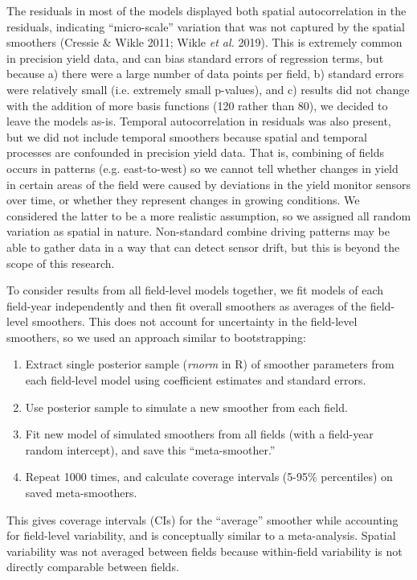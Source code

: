 \documentclass[]{elsarticle} %
\providecommand{\tightlist}{%
  \setlength{\itemsep}{0pt}\setlength{\parskip}{0pt}}
\begin{document}
The residuals in most of the models displayed both spatial autocorrelation in the residuals, indicating ``micro-scale'' variation that was not captured by the spatial smoothers (Cressie \& Wikle 2011; Wikle \emph{et al.} 2019).
This is extremely common in precision yield data, and can bias standard errors of regression terms, but because a) there were a large number of data points per field, b) standard errors were relatively small (i.e. extremely small p-values), and c) results did not change with the addition of more basis functions (120 rather than 80), we decided to leave the models as-is.
Temporal autocorrelation in residuals was also present, but we did not include temporal smoothers because spatial and temporal processes are confounded in precision yield data.
That is, combining of fields occurs in patterns (e.g. east-to-west) so we cannot tell whether changes in yield in certain areas of the field were caused by deviations in the yield monitor sensors over time, or whether they represent changes in growing conditions.
We considered the latter to be a more realistic assumption, so we assigned all random variation as spatial in nature.
Non-standard combine driving patterns may be able to gather data in a way that can detect sensor drift, but this is beyond the scope of this research.

To consider results from all field-level models together, we fit models of each field-year independently and then fit overall smoothers as averages of the field-level smoothers.
This does not account for uncertainty in the field-level smoothers, so we used an approach similar to bootstrapping:

\begin{enumerate}
\def\labelenumi{\arabic{enumi}.}
\tightlist
\item Extract single posterior sample (\emph{rnorm} in R) of smoother parameters from each field-level model using coefficient estimates and standard errors.
\item Use posterior sample to simulate a new smoother from each field.
\item Fit new model of simulated smoothers from all fields (with a field-year random intercept), and save this ``meta-smoother.''
\item Repeat 1000 times, and calculate coverage intervals (5-95\% percentiles) on saved meta-smoothers.
\end{enumerate}

This gives coverage intervals (CIs) for the ``average'' smoother while accounting for field-level variability, and is conceptually similar to a meta-analysis.
Spatial variability was not averaged between fields because within-field variability is not directly comparable between fields.
\end{document}
